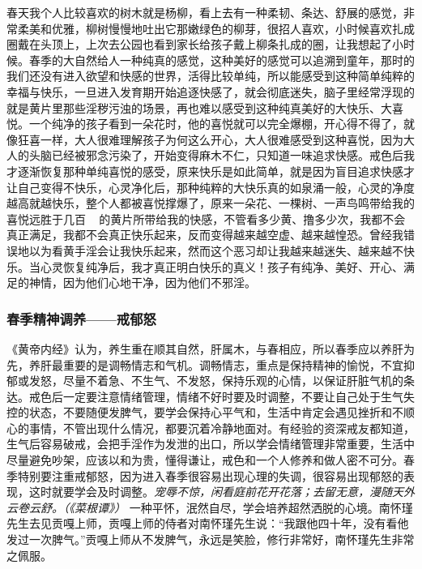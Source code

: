 春天我个人比较喜欢的树木就是杨柳，看上去有一种柔韧、条达、舒展的感觉，非常柔美和优雅，柳树慢慢地吐出它那嫩绿色的柳芽，很招人喜欢，小时候喜欢扎成圈戴在头顶上，上次去公园也看到家长给孩子戴上柳条扎成的圈，让我想起了小时候。春季的大自然给人一种纯真的感觉，这种美好的感觉可以追溯到童年，那时的我们还没有进入欲望和快感的世界，活得比较单纯，所以能感受到这种简单纯粹的幸福与快乐，一旦进入发育期开始追逐快感了，就会彻底迷失，脑子里经常浮现的就是黄片里那些淫秽污浊的场景，再也难以感受到这种纯真美好的大快乐、大喜悦。一个纯净的孩子看到一朵花时，他的喜悦就可以完全爆棚，开心得不得了，就像狂喜一样，大人很难理解孩子为何这么开心，大人很难感受到这种喜悦，因为大人的头脑已经被邪念污染了，开始变得麻木不仁，只知道一味追求快感。戒色后我才逐渐恢复那种单纯喜悦的感受，原来快乐是如此简单，就是因为盲目追求快感才让自己变得不快乐，心灵净化后，那种纯粹的大快乐真的如泉涌一般，心灵的净度越高就越快乐，整个人都被喜悦撑爆了，原来一朵花、一棵树、一声鸟鸣带给我的喜悦远胜于几百 \unit{\giga\byte} 的黄片所带给我的快感，不管看多少黄、撸多少次，我都不会真正满足，我都不会真正快乐起来，反而变得越来越空虚、越来越惶恐。曾经我错误地以为看黄手淫会让我快乐起来，然而这个恶习却让我越来越迷失、越来越不快乐。当心灵恢复纯净后，我才真正明白快乐的真义！孩子有纯净、美好、开心、满足的神情，因为他们心地干净，因为他们不邪淫。

\subsubsection{春季精神调养——戒郁怒}

《黄帝内经》认为，养生重在顺其自然，肝属木，与春相应，所以春季应以养肝为先，养肝最重要的是调畅情志和气机。调畅情志，重点是保持精神的愉悦，不宜抑郁或发怒，尽量不着急、不生气、不发怒，保持乐观的心情，以保证肝脏气机的条达。戒色后一定要注意情绪管理，情绪不好时要及时调整，不要让自己处于生气失控的状态，不要随便发脾气，要学会保持心平气和，生活中肯定会遇见挫折和不顺心的事情，不管出现什么情况，都要沉着冷静地面对。有经验的资深戒友都知道，生气后容易破戒，会把手淫作为发泄的出口，所以学会情绪管理非常重要，生活中尽量避免吵架，应该以和为贵，懂得谦让，戒色和一个人修养和做人密不可分。春季特别要注重戒郁怒，因为进入春季很容易出现心理的失调，很容易出现郁怒的表现，这时就要学会及时调整。\textit{宠辱不惊，闲看庭前花开花落；去留无意，漫随天外云卷云舒。（《菜根谭》）} 一种平怀，泯然自尽，学会培养超然洒脱的心境。南怀瑾先生去见贡嘎上师，贡嘎上师的侍者对南怀瑾先生说：“我跟他四十年，没有看他发过一次脾气。”贡嘎上师从不发脾气，永远是笑脸，修行非常好，南怀瑾先生非常之佩服。

